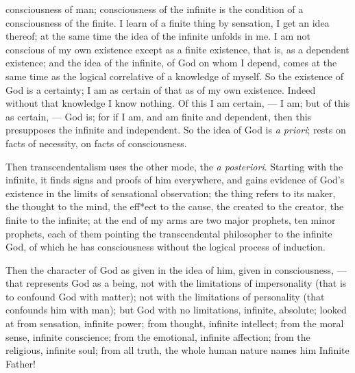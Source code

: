 \documentclass[12pt]{article}
\begin{document}
consciousness of man; consciousness of the infinite is 
the condition of a consciousness of the finite. I learn 
of a finite thing by sensation, I get an idea thereof; 
at the same time the idea of the infinite unfolds in me. 
I am not conscious of my own existence except as a 
finite existence, that is, as a dependent existence; and 
the idea of the infinite, of God on whom I depend, comes 
at the same time as the logical correlative of a knowledge of myself. So the existence of God is a certainty; I am as certain of that as of my own existence. 
Indeed without that knowledge I know nothing. Of 
this I am certain, --- I am; but of this as certain, --- God 
is; for if I am, and am finite and dependent, then this 
presupposes the infinite and independent. So the idea 
of God is \emph{a priori}; rests on facts of necessity, on facts 
of consciousness. 

Then transcendentalism uses the other mode, the 
\emph{a posteriori}. Starting with the infinite, it finds signs 
and proofs of him everywhere, and gains evidence of 
God's existence in the limits of sensational observation; 
the thing refers to its maker, the thought to the mind, 
the eff*ect to the cause, the created to the creator, the 
finite to the infinite; at the end of my arms are two 
major prophets, ten minor prophets, each of them 
pointing the transcendental philosopher to the infinite 
God, of which he has consciousness without the logical 
process of induction. 

Then the character of God as given in the idea of 
him, given in consciousness, --- that represents God as a 
being, not with the limitations of impersonality (that 
is to confound God with matter); not with the limitations of personality (that confounds him with man); 
but God with no limitations, infinite, absolute; looked 
at from sensation, infinite power; from thought, infinite intellect; from the moral sense, infinite conscience; 
from the emotional, infinite affection; from the religious, infinite soul; from all truth, the whole human 
nature names him Infinite Father! 
\end{document}
